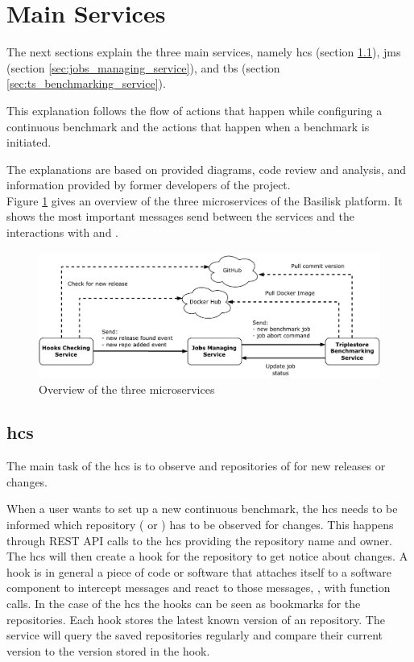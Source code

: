 \section{Main Services}
\label{sec:main_services}
The next sections explain the three main services, namely \acl{hcs} (section \ref{sec:hooks_checking_service}), \acl{jms} (section \ref{sec:jobs_managing_service}), and \acl{tbs} (section \ref{sec:ts_benchmarking_service}).

This explanation follows the flow of actions that happen while configuring a continuous benchmark and the actions that happen when a benchmark is initiated.

The explanations are based on provided diagrams, code review and analysis, and information provided by former developers of the project.
\\

Figure \ref{fig:basilisk_high_level_design_approach} gives an overview of the three microservices of the Basilisk platform.
It shows the most important messages send between the services and the interactions with \gh{} and \dockh{}.
\begin{figure}[tbph]
	\centering
	\includegraphics[width=1\textwidth]{figures/high-level-design-approach.pdf}
	\caption{Overview of the three microservices}
	\label{fig:basilisk_high_level_design_approach}
\end{figure}



\subsection{\acl{hcs}}
\label{sec:hooks_checking_service}
The main task of the \ac{hcs} is to observe \gh{} and \dockh{} repositories of \tsp{} for new releases or changes.

When a user wants to set up a new continuous benchmark, the \ac{hcs} needs to be informed which repository (\gh{} or \dockh{}) has to be observed for changes.
This happens through REST API calls to the \ac{hcs} providing the repository name and owner.
The \ac{hcs} will then create a hook for the repository to get notice about changes.
A hook is in general a piece of code or software that attaches itself to a software component to intercept messages and react to those messages, \eg, with function calls.
In the case of the \ac{hcs} the hooks can be seen as bookmarks for the repositories.
Each hook stores the latest known version of an repository.
The service will query the saved repositories regularly and compare their current version to the version stored in the hook.

